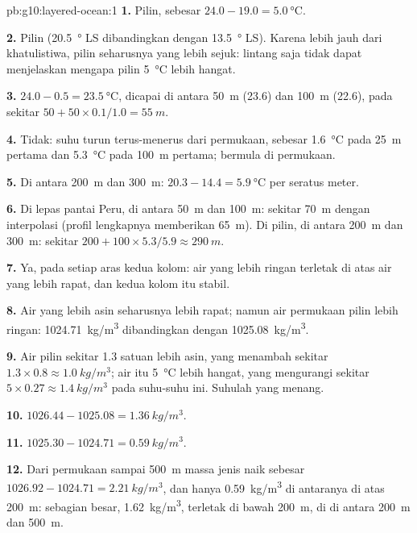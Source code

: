 \begin{solution}{pb:g10:layered-ocean:1}
\textbf{1.} Pilin, sebesar $24.0 - 19.0 = \qty{5.0}{\degreeCelsius}$.

\textbf{2.} Pilin (\qty{20.5}{\degree} LS dibandingkan dengan \qty{13.5}{\degree} LS).
Karena lebih jauh dari khatulistiwa, pilin seharusnya yang lebih sejuk: lintang
saja tidak dapat menjelaskan mengapa pilin \qty{5}{\degreeCelsius} lebih
hangat.

\textbf{3.} $24.0 - 0.5 = \qty{23.5}{\degreeCelsius}$, dicapai di antara
\qty{50}{m} (23.6) dan \qty{100}{m} (22.6), pada sekitar $50 + 50 \times
0.1/1.0 = \qty{55}{m}$.

\textbf{4.} Tidak: suhu turun terus-menerus dari permukaan, sebesar
\qty{1.6}{\degreeCelsius} pada \qty{25}{m} pertama dan
\qty{5.3}{\degreeCelsius} pada \qty{100}{m} pertama;  bermula di
permukaan.

\textbf{5.} Di antara \qty{200}{m} dan \qty{300}{m}: $20.3 - 14.4 =
\qty{5.9}{\degreeCelsius}$ per seratus meter.

\textbf{6.} Di lepas pantai Peru, di antara \qty{50}{m} dan \qty{100}{m}:
sekitar \qty{70}{m} dengan interpolasi (profil lengkapnya memberikan
\qty{65}{m}). Di pilin, di antara \qty{200}{m} dan \qty{300}{m}: sekitar
$200 + 100 \times 5.3/5.9
\approx \qty{290}{m}$.

\textbf{7.} Ya, pada setiap aras kedua kolom: air yang lebih ringan terletak
di atas air yang lebih rapat, dan kedua kolom itu stabil.

\textbf{8.} Air yang lebih asin seharusnya lebih rapat; namun air permukaan
pilin lebih ringan: \qty{1024.71}{kg/m^3} dibandingkan dengan
\qty{1025.08}{kg/m^3}.

\textbf{9.} Air pilin sekitar 1.3 satuan lebih asin, yang menambah sekitar
$1.3 \times 0.8 \approx \qty{1.0}{kg/m^3}$; air itu \qty{5}{\degreeCelsius}
lebih hangat, yang mengurangi sekitar
$5 \times 0.27 \approx \qty{1.4}{kg/m^3}$ pada suhu-suhu ini. Suhulah yang menang.

\textbf{10.} $1026.44 - 1025.08 = \qty{1.36}{kg/m^3}$.

\textbf{11.} $1025.30 - 1024.71 = \qty{0.59}{kg/m^3}$.

\textbf{12.} Dari permukaan sampai \qty{500}{m} massa jenis naik sebesar
$1026.92 - 1024.71 = \qty{2.21}{kg/m^3}$, dan hanya \qty{0.59}{kg/m^3} di
antaranya di atas \qty{200}{m}: sebagian besar, \qty{1.62}{kg/m^3}, terletak
di bawah \qty{200}{m}, di  di antara \qty{200}{m} dan \qty{500}{m}.


\end{solution}
